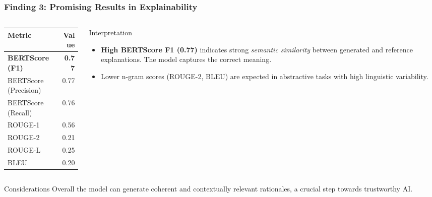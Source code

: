 \documentclass[aspectratio=169]{beamer}
\begin{document}
\begin{frame}
  \frametitle{Finding 3: Promising Results in Explainability}
  
  
  \begin{columns}[T]
    \begin{column}{0.35\textwidth}
      \begin{table}
        \begin{tabular}{lr}
          \toprule
          \textbf{Metric} & \textbf{Value} \\
          \midrule
          \textbf{BERTScore (F1)} & \textbf{0.77} \\
          BERTScore (Precision) & 0.77 \\
          BERTScore (Recall) & 0.76 \\
          ROUGE-1 & 0.56 \\
          ROUGE-2 & 0.21 \\
          ROUGE-L & 0.25 \\
          BLEU & 0.20 \\
          \bottomrule
        \end{tabular}
      \end{table}
    \end{column}
    \begin{column}{0.55\textwidth}
      \begin{alertblock}{Interpretation}
        \begin{itemize}
            \item \textbf{High BERTScore F1 (0.77)} indicates strong \textit{semantic similarity} between generated and reference explanations. The model captures the correct meaning.
            \item Lower n-gram scores (ROUGE-2, BLEU) are expected in abstractive tasks with high linguistic variability.
        \end{itemize}
      \end{alertblock}
    \end{column}
  \end{columns}
  \begin{block}{Considerations}
    Overall the model can generate coherent and contextually relevant rationales, a crucial step towards trustworthy AI.
  \end{block}
\end{frame}
\end{document}
